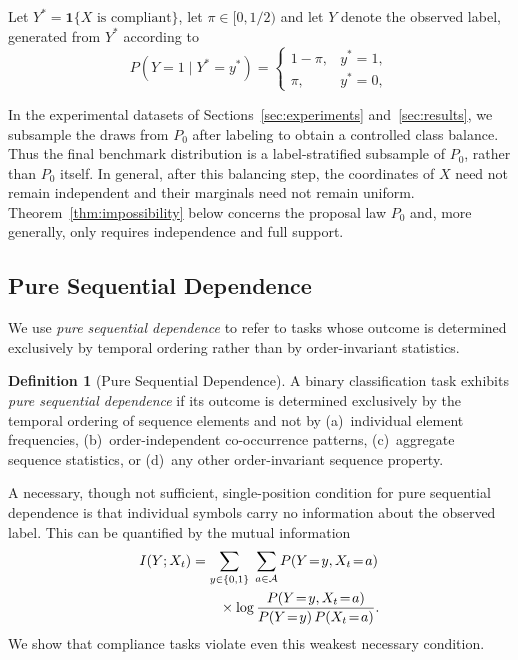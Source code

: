 \documentclass{article}
\theoremstyle{plain}
\theoremstyle{definition}
\newtheorem{definition}[theorem]{Definition}
\theoremstyle{remark}
\begin{document}
Let $Y^*=\mathbf{1}\{X \text{ is compliant}\}$, let $\pi\in[0,1/2)$ and let $Y$ denote the
observed label, generated from $Y^*$ according to
\begin{equation}
\label{eq:label_noise}
P(Y=1\mid Y^*=y^*)=
\begin{cases}
1-\pi, & y^*=1,\\
\pi, & y^*=0,
\end{cases}
\end{equation}

In the experimental datasets of Sections~\ref{sec:experiments}
and~\ref{sec:results}, we subsample the draws from $P_0$ after labeling
to obtain a controlled class balance. Thus the final benchmark distribution
is a label-stratified subsample of $P_0$, rather than $P_0$ itself. In
general, after this balancing step, the coordinates of $X$ need not remain
independent and their marginals need not remain uniform.
Theorem~\ref{thm:impossibility} below concerns the proposal law $P_0$
and, more generally, only requires independence and full support.


\subsection{Pure Sequential Dependence}
\label{sec:pure_sequential_def}

We use \emph{pure sequential dependence} to refer to tasks whose outcome
is determined exclusively by temporal ordering rather than by order-invariant
statistics.

\begin{definition}[Pure Sequential Dependence]
\label{def:pure_sequential}
A binary classification task exhibits \emph{pure sequential dependence}
if its outcome is determined exclusively by the temporal ordering of
sequence elements and not by
(a)~individual element frequencies,
(b)~order-independent co-occurrence patterns,
(c)~aggregate sequence statistics, or
(d)~any other order-invariant sequence property.
\end{definition}

A necessary, though not sufficient, single-position condition for pure
sequential dependence is that individual symbols carry no information about
the observed label. This can be quantified by the mutual information
\begin{align}
\label{eq:mutual_info}
I(Y;X_t)
&= \sum_{y\in\{0,1\}}\;\sum_{a\in\mathcal{A}}
P(Y\!=\!y,X_t\!=\!a) \notag\\
&\qquad\times\log
\frac{P(Y\!=\!y,X_t\!=\!a)}{P(Y\!=\!y)\,P(X_t\!=\!a)}.
\end{align}
We show that compliance tasks violate even this weakest necessary condition.
\end{document}
